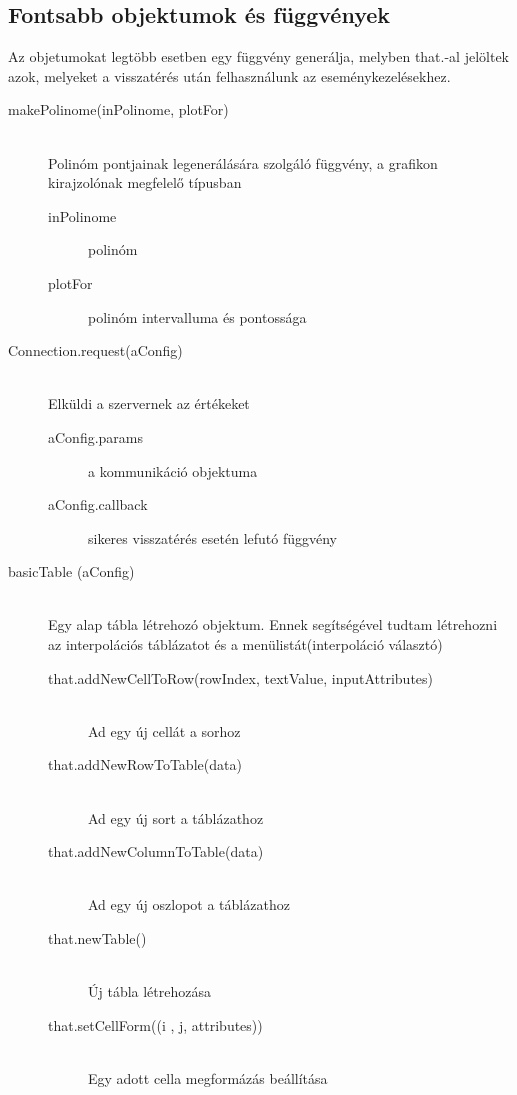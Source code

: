 \subsection{Fontsabb objektumok és függvények}
	\hfill
	Az objetumokat legtöbb esetben egy függvény generálja, melyben that.-al jelöltek azok, melyeket a visszatérés után felhasználunk az eseménykezelésekhez.
	\begin{description}
		\item[makePolinome(inPolinome, plotFor)] 
			\hfill \\ 
			Polinóm pontjainak legenerálására szolgáló függvény, a grafikon kirajzolónak megfelelő típusban
			\begin{description}
			\item[inPolinome] polinóm
			\item[plotFor] polinóm intervalluma és pontossága
			\end{description}
		\item[Connection.request(aConfig)] 
			\hfill \\ 
			Elküldi a szervernek az értékeket
			\begin{description}
			\item[aConfig.params] a kommunikáció objektuma
			\item[aConfig.callback] sikeres visszatérés esetén lefutó függvény
			\end{description}
		\item[basicTable (aConfig)]
			\hfill \\ 
			Egy alap tábla létrehozó objektum. Ennek segítségével tudtam létrehozni az interpolációs táblázatot és a menülistát(interpoláció választó)
			\begin{description}
			\item[that.addNewCellToRow(rowIndex, textValue, inputAttributes)] 
				\hfill \\  Ad egy új cellát a sorhoz
			\item[that.addNewRowToTable(data)]
				\hfill \\ Ad egy új sort a táblázathoz
			\item[that.addNewColumnToTable(data)]
				\hfill \\ Ad egy új oszlopot a táblázathoz
			\item[that.newTable()] 
				\hfill \\ Új tábla létrehozása
			\item[that.setCellForm((i , j, attributes))] 
				\hfill \\ Egy adott cella megformázás beállítása

\end{description}
\end{description}
